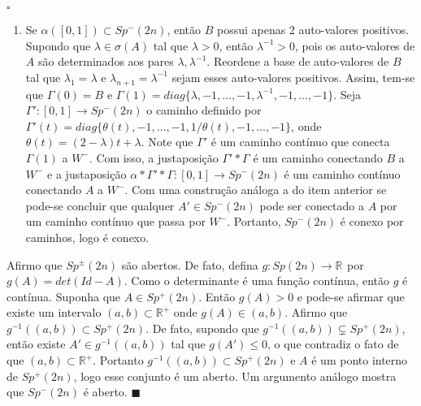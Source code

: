 \documentclass[12pt]{book}
\newenvironment{prova}[1]{$\square$ #1}{\hfill$\blacksquare$}
\newcommand{\gruposimpletico}[1]{Sp(#1)}
\newcommand{\gruposimpleticonaodegenerado}[1]{Sp^{#1}(2n)}
\newcommand{\intervalo}{[0,1]}
\newcommand{\real}[1]{\mathbb{R}^{#1}}
\newcommand{\reta}{\real{}}
\begin{document}
\begin{prova}
\begin{enumerate}
			\item Se $\alpha([0,1]) \subset \gruposimpleticonaodegenerado{-}$, então $B$ possui apenas 2 auto-valores positivos. Supondo que $\lambda \in \sigma(A)$ tal que $\lambda > 0$, então $\lambda^{-1} > 0$, pois os auto-valores de $A$ são determinados aos pares $\lambda, \lambda^{-1}$. Reordene a base de auto-valores de $B$ tal que $\lambda_{1}=\lambda$ e $\lambda_{n+1}=\lambda^{-1}$ sejam esses auto-valores positivos. Assim, tem-se que $\Gamma(0) = B$ e $\Gamma(1) = diag\{\lambda, -1, \dots, -1, \lambda^{-1}, -1, \dots, -1\}$. Seja $\Gamma': \intervalo \to \gruposimpleticonaodegenerado{-}$ o caminho definido por $\Gamma'(t)=diag\{ \theta(t), -1,\dots, -1, 1/\theta(t) ,-1,\dots, -1\}$,
			onde $\theta(t)=(2- \lambda)t + \lambda$. Note que $\Gamma'$ é um caminho contínuo que conecta $\Gamma(1)$ a $W^{-}$. Com isso, a justaposição $\Gamma'*\Gamma$ é um caminho conectando $B$ a $W^{-}$ e a justaposição $\alpha * \Gamma'*\Gamma: \intervalo \to \gruposimpleticonaodegenerado{-}$ é um caminho contínuo conectando $A$ a $W^{-}$. Com uma construção análoga a do item anterior se pode-se concluir que qualquer $A' \in \gruposimpleticonaodegenerado{-}$ pode ser conectado a $A$ por um caminho contínuo que passa por $W^{-}$. Portanto, $\gruposimpleticonaodegenerado{-}$ é conexo por caminhos, logo é conexo.
		\end{enumerate}
		
		Afirmo que $\gruposimpleticonaodegenerado{\pm}$ são abertos. De fato, defina $g:\gruposimpletico{2n}\to \reta$ por $g(A) = det(Id-A)$. Como o determinante é uma função contínua, então $g$ é contínua. Suponha que $A \in \gruposimpleticonaodegenerado{+}$. Então $g(A)>0$ e pode-se afirmar que existe um intervalo $(a,b) \subset \real{+}$ onde $g(A)\in (a,b)$. Afirmo que $g^{-1}((a,b))\subset \gruposimpleticonaodegenerado{+}$.  De fato, supondo que $g^{-1}((a,b)) \varsubsetneq \gruposimpleticonaodegenerado{+}$, então existe $A' \in g^{-1}((a,b))$ tal que $g(A')\leq 0$, o que contradiz o fato de que $(a,b) \subset \real{+}$. Portanto $g^{-1}((a,b)) \subset \gruposimpleticonaodegenerado{+}$ e $A$ é um ponto interno de $\gruposimpleticonaodegenerado{+}$, logo esse conjunto é um aberto. Um argumento análogo mostra que $\gruposimpleticonaodegenerado{-}$ é aberto.
	\end{prova}
	
\end{document}
